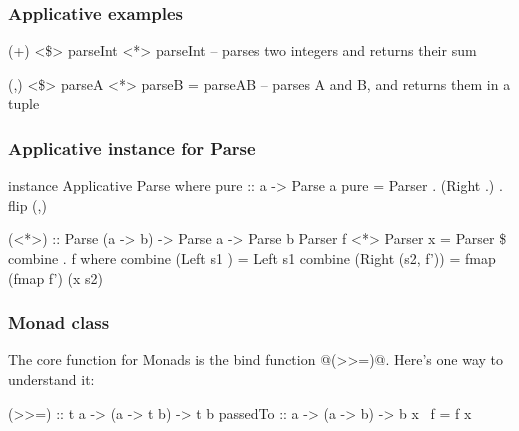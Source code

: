 \documentclass{beamer}
\begin{document}
\begin{frame}
\frametitle{Applicative examples}
(+) <\$> parseInt <*> parseInt
-- parses two integers and returns their sum

(,) <\$> parseA <*> parseB = parseAB
-- parses A and B, and returns them in a tuple
\end{frame}


%
%
%


\begin{frame}
\frametitle{Applicative instance for Parse}
instance Applicative Parse where
  pure :: a -> Parse a
  pure = Parser . (Right .) . flip (,)

  (<*>) :: Parse (a -> b) -> Parse a -> Parse b
  Parser f <*> Parser x = Parser \$ combine . f
    where
      combine (Left   s1     ) = Left      s1
      combine (Right (s2, f')) = fmap (fmap f') (x s2)
\end{frame}


%
%
%
%
%
%


\begin{frame}
\frametitle{Monad class}
The core function for Monads is the bind function @(>>=)@. Here's one way to understand it:

(>>=)    :: t a -> (a -> t b) -> t b
passedTo ::   a -> (a ->   b) ->   b
x \passedTo\ f = f x

\end{frame}
\end{document}

